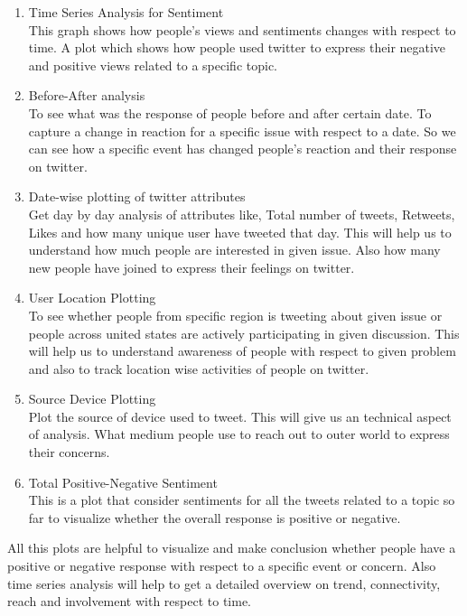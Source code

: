 \documentclass[journal, a4paper]{IEEEtran}
\begin{document}
\begin{enumerate}
  \item Time Series Analysis for Sentiment\\ This graph shows how people’s views and sentiments changes with respect to time. A plot which shows how people used twitter to express their negative and positive views related to a specific topic.
  \item Before-After analysis\\ To see what was the response of people before and after certain date. To capture a change in reaction for a specific issue with respect to a date. So we can see how a specific event has changed people’s reaction and their response on twitter.
  \item Date-wise plotting of twitter attributes\\ Get day by day analysis of attributes like, Total number of tweets, Retweets, Likes and how many unique user have tweeted that day. This will help us to understand how much people are interested in given issue. Also how many new people have joined to express their feelings on twitter.
  \item User Location Plotting\\ To see whether people from specific region is tweeting about given issue or people across united states are actively participating in given discussion. This will help us to understand awareness of people with respect to given problem and also to track location wise activities of people on twitter. 
  \item Source Device Plotting\\ Plot the source of device used to tweet. This will give us an technical aspect of analysis. What medium people use to reach out to outer world to express their concerns.
  \item Total Positive-Negative Sentiment\\ This is a plot that consider sentiments for all the tweets related to a topic so far to visualize whether the overall response is positive or negative. 
\end{enumerate}
All this plots are helpful to visualize and make conclusion whether people have a positive or negative response with respect to a specific event or concern. Also time series analysis will help to get a detailed overview on trend, connectivity, reach and involvement with respect to time.


\end{document}
